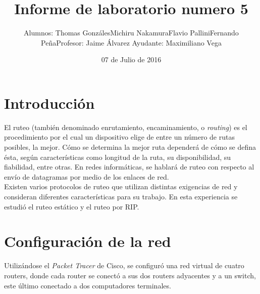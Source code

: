 \documentclass[spanish]{udpreport}
\title{Informe de laboratorio numero 5}
\begin{document}
  \author{Alumnos:	Thomas Gonzáles\linebreak Michiru Nakamura\linebreak Flavio Pallini\linebreak Fernando Peña\linebreak\linebreak Profesor:	Jaime Álvarez \linebreak Ayudante:	Maximiliano Vega }

\date{07 de Julio de 2016}



\maketitle

\tableofcontents

\chapter{Introducción}
\LARGE El ruteo (también denominado enrutamiento, encaminamiento, o \textit{routing}) es el procedimiento por el cual un dispositivo elige de entre un número de rutas posibles, la mejor. Cómo se determina la mejor ruta dependerá de cómo se defina ésta, según características como longitud de la ruta, su disponibilidad, su fiabilidad, entre otras. En redes informáticas, se hablará de ruteo con respecto al envío de datagramas por medio de los enlaces de red. \\

Existen varios protocolos de ruteo que utilizan distintas exigencias de red y consideran diferentes características para su trabajo. En esta experiencia se estudió el ruteo estático y el ruteo por RIP.
\noindent

\chapter{Configuración de la red}

Utilizándose el \textit{Packet Tracer} de Cisco, se configuró una red virtual de cuatro routers, donde cada router se conectó a sus dos routers adyacentes y a un switch, este último conectado a dos computadores terminales.
\end{document}
